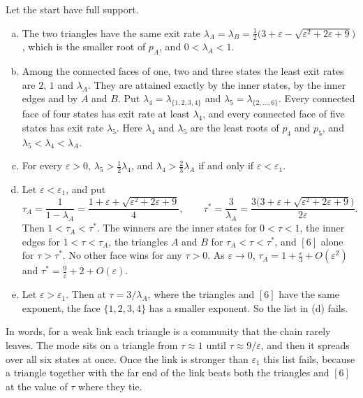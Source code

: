 \begin{proposition}\label{prop:triangles}
Let the start have full support.
\begin{enumerate}[(a)]
\item The two triangles have the same exit rate
$\lambda_A=\lambda_B=\frac12\bigl(3+\varepsilon-\sqrt{\varepsilon^2+2\varepsilon+9}\bigr)$,
which is the smaller root of $p_A$, and $0<\lambda_A<1$.
\item Among the connected faces of one, two and three states the least exit
rates are $2$, $1$ and $\lambda_A$. They are attained exactly by the inner
states, by the inner edges and by $A$ and $B$. Put
$\lambda_4=\lambda_{\{1,2,3,4\}}$ and $\lambda_5=\lambda_{\{2,\dots,6\}}$. Every
connected face of four states has exit rate at least $\lambda_4$, and every
connected face of five states has exit rate $\lambda_5$. Here $\lambda_4$ and
$\lambda_5$ are the least roots of $p_4$ and $p_5$, and
$\lambda_5<\lambda_4<\lambda_A$.
\item For every $\varepsilon>0$, $\lambda_5>\frac12\lambda_4$, and
$\lambda_4>\frac23\lambda_A$ if and only if $\varepsilon<\varepsilon_1$.
\item Let $\varepsilon<\varepsilon_1$, and put
\[
 \tau_A=\frac1{1-\lambda_A}=\frac{1+\varepsilon+\sqrt{\varepsilon^2+2\varepsilon+9}}4,
 \qquad
 \tau^*=\frac3{\lambda_A}=\frac{3\bigl(3+\varepsilon+\sqrt{\varepsilon^2+2\varepsilon+9}\bigr)}{2\varepsilon}.
\]
Then $1<\tau_A<\tau^*$. The winners are the inner states for $0<\tau<1$, the
inner edges for $1<\tau<\tau_A$, the triangles $A$ and $B$ for
$\tau_A<\tau<\tau^*$, and $[6]$ alone for $\tau>\tau^*$. No other face wins
for any $\tau>0$. As $\varepsilon\to0$,
$\tau_A=1+\frac\varepsilon3+O(\varepsilon^2)$ and
$\tau^*=\frac9\varepsilon+2+O(\varepsilon)$.
\item Let $\varepsilon>\varepsilon_1$. Then at $\tau=3/\lambda_A$, where the
triangles and $[6]$ have the same exponent, the face $\{1,2,3,4\}$ has a
smaller exponent. So the list in (d) fails.
\end{enumerate}
\end{proposition}

In words, for a weak link each triangle is a community that the chain rarely
leaves. The mode sits on a triangle from $\tau\approx1$ until
$\tau\approx9/\varepsilon$, and then it spreads over all six states at once.
Once the link is stronger than $\varepsilon_1$ this list fails, because a
triangle together with the far end of the link beats both the triangles and
$[6]$ at the value of $\tau$ where they tie.

